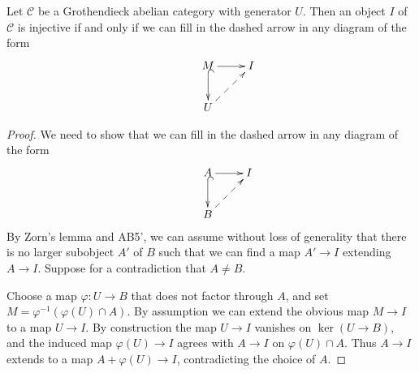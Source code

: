 \begin{lem}\label{criterion} Let $\mathcal{C}$ be a Grothendieck abelian category with generator $U$. Then an object $I$ of $\mathcal{C}$ is injective if and only if we can fill in the dashed arrow in any diagram of the form
\begin{align*}
\xymatrix{&M \ar[r] \ar@{^{(}->}[d] & I\\
&U \ar@{-->}[ur]}
\end{align*}
\end{lem}
\begin{proof} We need to show that we can fill in the dashed arrow in any diagram of the form
\begin{align*}
\xymatrix{&A \ar[r] \ar@{^{(}->}[d] & I\\
&B \ar@{-->}[ur]}
\end{align*}
By Zorn's lemma and AB5', we can assume without loss of generality that there is no larger subobject $A'$ of $B$ such that we can find a map $A'\rightarrow I$ extending $A\rightarrow I$. Suppose for a contradiction that $A\ne B$.

Choose a map $\varphi:U\rightarrow B$ that does not factor through $A$, and set $M = \varphi^{-1}(\varphi(U)\cap A)$. By assumption we can extend the obvious map $M\rightarrow I$ to a map $U\rightarrow I$. By construction the map $U\rightarrow I$ vanishes on $\ker(U\rightarrow B)$, and the induced map $\varphi(U) \rightarrow I$ agrees with $A\rightarrow I$ on $\varphi(U)\cap A$. Thus $A\rightarrow I$ extends to a map $A+\varphi(U)\rightarrow I$, contradicting the choice of $A$.
\end{proof}

